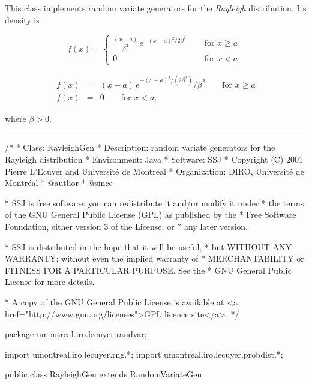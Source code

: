 
This class implements random variate generators for the
{\em Rayleigh\/} distribution.
 Its density is
\begin{latexonly}
\[
 f(x) = \left\{
\begin{array}{ll}
   \frac{(x-a)}{\beta^2}\, e^{-(x-a)^2/2\beta^2} \quad
 &  \mbox{ for } x \ge  a \\[6pt]
    0  & \mbox{ for } x < a,
\end{array}
   \right.
\]
\end{latexonly}
\begin{htmlonly}
\begin{eqnarray*}
  f(x) &=& {(x-a)}\, e^{-(x-a)^2/(2\beta^2)} / {\beta^2}
 \qquad\mbox{for } x \ge a \\[8pt]
   f(x) &=& 0  \qquad\mbox{for } x < a,
\end{eqnarray*}
\end{htmlonly}
where $\beta > 0$.


\bigskip\hrule

\begin{code}
\begin{hide}
/*
 * Class:        RayleighGen
 * Description:  random variate generators for the Rayleigh distribution
 * Environment:  Java
 * Software:     SSJ 
 * Copyright (C) 2001  Pierre L'Ecuyer and Université de Montréal
 * Organization: DIRO, Université de Montréal
 * @author       
 * @since

 * SSJ is free software: you can redistribute it and/or modify it under
 * the terms of the GNU General Public License (GPL) as published by the
 * Free Software Foundation, either version 3 of the License, or
 * any later version.

 * SSJ is distributed in the hope that it will be useful,
 * but WITHOUT ANY WARRANTY; without even the implied warranty of
 * MERCHANTABILITY or FITNESS FOR A PARTICULAR PURPOSE.  See the
 * GNU General Public License for more details.

 * A copy of the GNU General Public License is available at
   <a href="http://www.gnu.org/licenses">GPL licence site</a>.
 */
\end{hide}
package umontreal.iro.lecuyer.randvar;\begin{hide}
import umontreal.iro.lecuyer.rng.*;
import umontreal.iro.lecuyer.probdist.*;
\end{hide}

public class RayleighGen extends RandomVariateGen \begin{hide} {
   private double a;
   private double beta;
\end{hide}\end{code}

